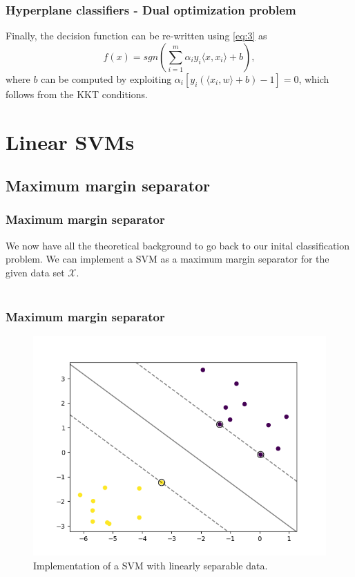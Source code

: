 \documentclass{beamer}
\begin{document}
\begin{frame}{}
    \frametitle{Hyperplane classifiers - Dual optimization problem}
    Finally, the decision function can be re-written using \eqref{eq:3} as
    \begin{equation}
        f(x) = sgn \left( \sum_{i=1}^{m} \alpha_i y_i \langle x,x_i \rangle + b \right),
    \end{equation}
    where $b$ can be computed by exploiting $\alpha_i \left[ y_i \left( \langle x_i,w \rangle + b \right) - 1 \right] = 0$, which follows from the KKT conditions.
\end{frame}



\section{Linear SVMs}

\subsection{Maximum margin separator}

\begin{frame}{}
    \frametitle{Maximum margin separator}
    We now have all the theoretical background to go back to our inital classification problem. We can implement a SVM as a maximum margin separator for the given data set $\mathcal{X}$. \\~\\  
\end{frame}

\begin{frame}{}
	\frametitle{Maximum margin separator}
	\begin{figure}
		\centering
		\includegraphics[width=0.7\linewidth]{img/LinearSVM_complete.png}
		\caption{Implementation of a SVM with linearly separable data.}
		\label{fig:linearsvm}
	\end{figure}
	 
\end{frame}
\end{document}
